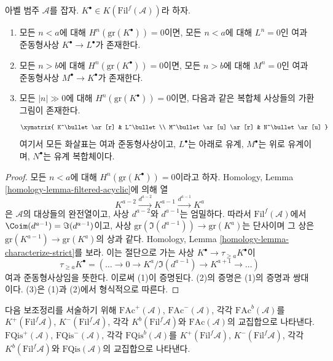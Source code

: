 \begin{lemma}
\label{lemma-filtered-complex-cohomology-bounded}
아벨 범주 $\mathcal{A}$를 잡자.
$K^\bullet \in K(\text{Fil}^f(\mathcal{A}))$라 하자.
\begin{enumerate}
\item 모든 $n < a$에 대해 $H^n(\text{gr}(K^\bullet)) = 0$이면,
모든 $n < a$에 대해 $L^n = 0$인 여과 준동형사상
$K^\bullet \to L^\bullet$가 존재한다.
\item 모든 $n > b$에 대해 $H^n(\text{gr}(K^\bullet)) = 0$이면,
모든 $n > b$에 대해 $M^n = 0$인 여과 준동형사상
$M^\bullet \to K^\bullet$가 존재한다.
\item 모든 $|n| \gg 0$에 대해 $H^n(\text{gr}(K^\bullet)) = 0$이면,
다음과 같은 복합체 사상들의 가환 그림이 존재한다.
$$
\xymatrix{
K^\bullet \ar[r] & L^\bullet \\
M^\bullet \ar[u] \ar[r] & N^\bullet \ar[u]
}
$$
여기서 모든 화살표는 여과 준동형사상이고, $L^\bullet$는 아래로 유계,
$M^\bullet$는 위로 유계이며, $N^\bullet$는 유계 복합체이다.
\end{enumerate}
\end{lemma}

\begin{proof}
모든 $n < a$에 대해 $H^n(\text{gr}(K^\bullet)) = 0$이라고 하자.
Homology, Lemma \ref{homology-lemma-filtered-acyclic}에 의해
열
$$
K^{a - 2} \xrightarrow{d^{a - 2}} K^{a - 1} \xrightarrow{d^{a - 1}} K^a
$$
은 $\mathcal{A}$의 대상들의 완전열이고, 사상 $d^{a - 2}$와
$d^{a - 1}$는 엄밀하다. 따라서 $\text{Fil}^f(\mathcal{A})$에서
$\Coim(d^{a - 1}) = \Im(d^{a - 1})$이고,
사상 $\text{gr}(\Im(d^{a - 1})) \to \text{gr}(K^a)$는 단사이며
그 상은 $\text{gr}(K^{a - 1}) \to \text{gr}(K^a)$의 상과 같다.
Homology, Lemma \ref{homology-lemma-characterize-strict}를 보라.
이는 절단으로 가는 사상 $K^\bullet \to \tau_{\geq a}K^\bullet$이
$$
\tau_{\geq a}K^\bullet =
(\ldots \to 0 \to K^a/\Im(d^{a - 1}) \to K^{a + 1} \to \ldots)
$$
여과 준동형사상임을 뜻한다. 이로써 (1)이 증명된다. (2)의 증명은
(1)의 증명과 쌍대이다. (3)은 (1)과 (2)에서 형식적으로 따른다.
\end{proof}

\noindent
다음 보조정리를 서술하기 위해 $\text{FAc}^{+}(\mathcal{A})$,
$\text{FAc}^{-}(\mathcal{A})$, 각각 $\text{FAc}^b(\mathcal{A})$를
$K^{+}(\text{Fil}^f\mathcal{A})$, $K^{-}(\text{Fil}^f\mathcal{A})$,
각각 $K^b(\text{Fil}^f\mathcal{A})$와 $\text{FAc}(\mathcal{A})$의
교집합으로 나타낸다. $\text{FQis}^{+}(\mathcal{A})$,
$\text{FQis}^{-}(\mathcal{A})$, 각각 $\text{FQis}^b(\mathcal{A})$를
$K^{+}(\text{Fil}^f\mathcal{A})$, $K^{-}(\text{Fil}^f\mathcal{A})$,
각각 $K^b(\text{Fil}^f\mathcal{A})$와 $\text{FQis}(\mathcal{A})$의
교집합으로 나타낸다.

